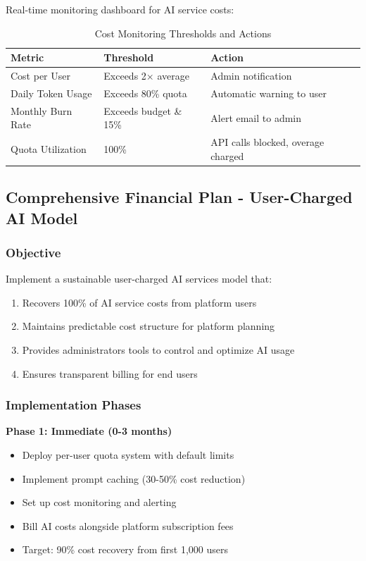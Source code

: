 \documentclass[11pt,a4paper]{article}
\begin{document}
\begin{enumerate}
Real-time monitoring dashboard for AI service costs:

\begin{table}[H]
\centering
\footnotesize
\begin{tabular}{|l|l|l|}
\hline
\textbf{Metric} & \textbf{Threshold} & \textbf{Action} \\
\hline
Cost per User & Exceeds 2$\times$ average & Admin notification \\
Daily Token Usage & Exceeds 80\% quota & Automatic warning to user \\
Monthly Burn Rate & Exceeds budget \& 15\% & Alert email to admin \\
Quota Utilization & 100\% & API calls blocked, overage charged \\
\hline
\end{tabular}
\caption{Cost Monitoring Thresholds and Actions}
\end{table}

\subsection{Comprehensive Financial Plan - User-Charged AI Model}

\subsubsection{Objective}

Implement a sustainable user-charged AI services model that:
\begin{enumerate}
    \item Recovers 100\% of AI service costs from platform users
    \item Maintains predictable cost structure for platform planning
    \item Provides administrators tools to control and optimize AI usage
    \item Ensures transparent billing for end users
\end{enumerate}

\subsubsection{Implementation Phases}

\textbf{Phase 1: Immediate (0-3 months)}
\begin{itemize}
    \item Deploy per-user quota system with default limits
    \item Implement prompt caching (30-50\% cost reduction)
    \item Set up cost monitoring and alerting
    \item Bill AI costs alongside platform subscription fees
    \item Target: 90\% cost recovery from first 1,000 users
\end{itemize}


\end{enumerate}
\end{document}
